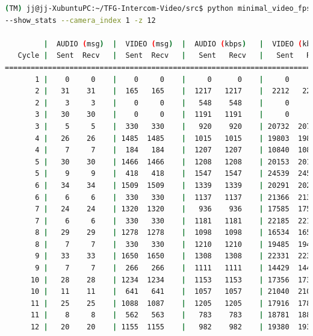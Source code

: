 \begin{lstlisting}[language=bash,basicstyle=\ttfamily\scriptsize]
(TM) jj@jj-XubuntuPC:~/TFG-Intercom-Video/src$ python minimal_video_fps.py --show_video 
--show_stats --camera_index 1 -z 12

         |  AUDIO (msg)  |  VIDEO (msg)  |  AUDIO (kbps)   |  VIDEO (kbps)   |     CPU (%) 
   Cycle |  Sent  Recv   |  Sent  Recv   |   Sent   Recv   |   Sent   Recv   | Program System
================================================================================================
       1 |    0     0    |    0     0    |     0      0    |     0      0    |   0    100       
       2 |   31    31    |  165   165    |  1217   1217    |  2212   2212    |  38     68       
       2 |    3     3    |    0     0    |   548    548    |     0      0    |  33     67       
       3 |   30    30    |    0     0    |  1191   1191    |     0      0    |  47     72       
       3 |    5     5    |  330   330    |   920    920    | 20732  20732    |  22     71       
       4 |   26    26    | 1485  1485    |  1015   1015    | 19803  19803    |  28     67       
       4 |    7     7    |  184   184    |  1207   1207    | 10840  10840    |  42     67       
       5 |   30    30    | 1466  1466    |  1208   1208    | 20153  20153    |  46     64       
       5 |    9     9    |  418   418    |  1547   1547    | 24539  24539    |  52     66       
       6 |   34    34    | 1509  1509    |  1339   1339    | 20291  20291    |  39     71       
       6 |    6     6    |  330   330    |  1137   1137    | 21366  21366    |  28     69       
       7 |   24    24    | 1320  1320    |   936    936    | 17585  17585    |  44     67       
       7 |    6     6    |  330   330    |  1181   1181    | 22185  22185    |  42     68       
       8 |   29    29    | 1278  1278    |  1098   1098    | 16534  16534    |  45     66       
       8 |    7     7    |  330   330    |  1210   1210    | 19485  19485    |  42     66       
       9 |   33    33    | 1650  1650    |  1308   1308    | 22331  22331    |  36     72       
       9 |    7     7    |  266   266    |  1111   1111    | 14429  14429    |  19     72       
      10 |   28    28    | 1234  1234    |  1153   1153    | 17356  17356    |  44     72       
      10 |   11    11    |  641   641    |  1057   1057    | 21040  21040    |  41     73       
      11 |   25    25    | 1088  1087    |  1205   1205    | 17916  17899    |  26     74       
      11 |    8     8    |  562   563    |   783    783    | 18781  18815    |  35     73       
      12 |   20    20    | 1155  1155    |   982    982    | 19380  19380    |  50     70       

\end{lstlisting}
